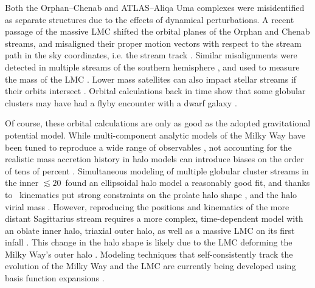 \documentclass[final,5p,times,twocolumn,authoryear]{elsarticle}
\begin{document}
Both the Orphan--Chenab and ATLAS--Aliqa Uma complexes were misidentified as separate structures due to the effects of dynamical perturbations.
A recent passage of the massive LMC shifted the orbital planes of the Orphan and Chenab streams, and misaligned their proper motion vectors with respect to the stream path in the sky coordinates, i.e. the stream track \citep{erkal:2019}.
Similar misalignments were detected in multiple streams of the southern hemisphere \citep{shipp:2019}, and used to measure the mass of the LMC \citep[$\gtrsim10^{11}\,\unit{\msun}$;][]{erkal:2019, shipp:2021, koposov:2023}.
Lower mass satellites can also impact stellar streams if their orbits intersect \citep[e.g.,][]{dillamore:2022}.
Orbital calculations back in time show that some globular clusters may have had a flyby encounter with a dwarf galaxy \citep{garrow:2020, el-falou:2022}.

Of course, these orbital calculations are only as good as the adopted gravitational potential model.
While multi-component analytic models of the Milky Way have been tuned to reproduce a wide range of observables \citep[e.g.,][]{bovy:2015, mcmillan:2017,price-whelan:2017}, not accounting for the realistic mass accretion history in halo models can introduce biases on the order of tens of percent \citep[e.g.,][]{bonaca:2014, dsouza:2022, arora:2022, santistevan:2024}.
Simultaneous modeling of multiple globular cluster streams in the inner $\lesssim20$\,\unit{\kpc} found an ellipsoidal halo model a reasonably good fit, and thanks to \gaia\ kinematics put strong constraints on the prolate halo shape \citep[$q_z=1.06\pm0.06$;][]{palau:2023}, and the halo virial mass \citep[$M_{200}=1.09^{+0.19}_{-0.14}\times10^{12}\,\unit{\msun}$;][see also \citealt{reino:2021}]{ibata:2023}.
However, reproducing the positions and kinematics of the more distant Sagittarius stream requires a more complex, time-dependent model with an oblate inner halo, triaxial outer halo, as well as a massive LMC on its first infall \citep{vasiliev:2021,kang:2023}.
This change in the halo shape is likely due to the LMC deforming the Milky Way's outer halo \citep[e.g.,][]{garavito-camargo:2019,shao:2021,vasiliev:2023}.
Modeling techniques that self-consistently track the evolution of the Milky Way and the LMC are currently being developed using basis function expansions \citep[e.g.,][]{sanders:2020,garavito-camargo:2021,lilleengen:2023}.
\end{document}
